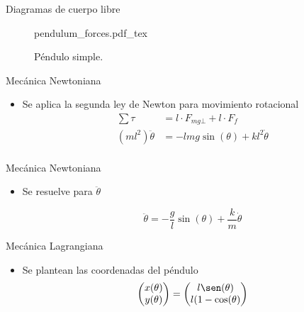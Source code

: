 \documentclass{beamer}
\begin{document}
\begin{frame}{Diagramas de cuerpo libre}
 \begin{figure}[ht]
    \centering
    {pendulum_forces.pdf_tex}
    \caption{Péndulo simple.}
    \label{fig: simple pendulum forces}
\end{figure}
\end{frame}

\begin{frame}{Mecánica Newtoniana}

\begin{itemize}
 \item Se aplica la segunda ley de Newton para movimiento rotacional
 \begin{equation}
\begin{split}
 \sum \tau &= l \cdot F_{mg\bot}  + l \cdot F_f\\
 (m l^2) \ddot{\theta} & = - l m g \sin(\theta)  + k l^2 \dot{\theta}\\
 \end{split}
 \label{eq: sum of moments magnitude}
\end{equation}

\end{itemize}

\end{frame}

\begin{frame}{Mecánica Newtoniana}
\begin{itemize}
 \item Se resuelve para $\ddot{\theta}$
 
 \begin{equation}
\ddot{\theta} = - \dfrac{g}{l} \sin(\theta) + \dfrac{k}{m} \dot{\theta}  
 \end{equation}

\end{itemize}
\end{frame}

\begin{frame}{Mecánica Lagrangiana}
 \begin{itemize}
  \item Se plantean las coordenadas del péndulo
  \begin{equation}
\begin{pmatrix}
x(\theta)\\
y(\theta)
\end{pmatrix}
= 
\begin{pmatrix}
l\sen(\theta)\\
l(1 - \cos(\theta)
\end{pmatrix}
\label{eq: lagrange position coordinates}
\end{equation}
 \end{itemize}
\end{frame}
\end{document}
